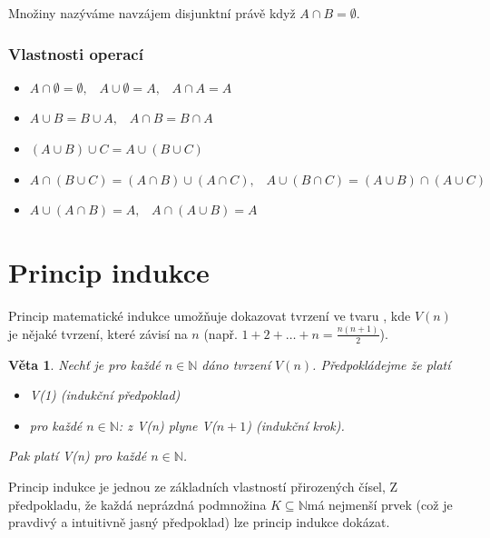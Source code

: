 \documentclass[12pt,a4paper]{article}
\newtheorem{sentence}{Věta}
\begin{document}
Množiny nazýváme navzájem disjunktní právě když $A \cap B = \emptyset$.

\subsubsection{Vlastnosti operací}
\begin{itemize}
	\item $A \cap \emptyset = \emptyset, \hspace{10pt} A \cup \emptyset = A,\hspace{10pt} A \cap A = A$
	\item $A \cup B = B \cup A, \hspace{10pt} A \cap B = B \cap A$
	\item $(A \cup B) \cup C = A \cup (B \cup C)$
	\item $A \cap (B \cup C) = (A \cap B) \cup (A \cap C), \hspace{10pt} A \cup (B \cap C) = (A \cup B) \cap (A \cup C)$
	\item $A \cup (A \cap B) = A, \hspace{10pt} A \cap (A \cup B) = A$
\end{itemize}

\section{Princip indukce}
Princip matematické indukce umožňuje dokazovat tvrzení ve tvaru , kde $V(n)$ je nějaké tvrzení, které závisí na $n$ (např. $1 + 2 + \dots + n = \frac{n(n+1)}{2}$).

\begin{sentence}
	Nechť je pro každé $n \in \mathbb{N}$ dáno tvrzení $V(n)$. Předpokládejme že platí
	\begin{itemize}
		\item V(1) (indukční předpoklad)
		\item pro každé $n \in \mathbb{N}$: z V(n) plyne V($n+1$) (indukční krok).
	\end{itemize}
	Pak platí V(n) pro každé $n \in \mathbb{N}$.
\end{sentence}

Princip indukce je jednou ze základních vlastností přirozených čísel, Z předpokladu, že každá neprázdná podmnožina $K \subseteq \mathbb{N}$má nejmenší prvek (což je pravdivý a intuitivně jasný předpoklad) lze princip indukce dokázat.
\end{document}
